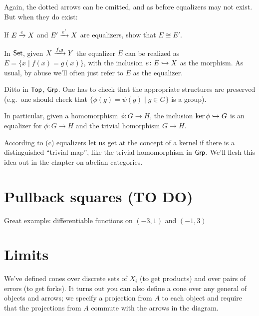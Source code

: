 Again, the dotted arrows can be omitted, and as before equalizers may not exist.
But when they do exist:
\begin{exercise}
	If $E \xrightarrow{e} X$ and $E' \xrightarrow{e'} X$ are equalizers,
	show that $E \cong E'$.
\end{exercise}

\begin{example}
	\listhack
	\begin{enumerate}[(a)]
		\ii In $\mathsf{Set}$, given $X \xrightarrow{f,g} Y$
		the equalizer $E$ can be realized as $E = \{x \mid f(x) = g(x)\}$,
		with the inclusion $e \colon E \hookrightarrow X$ as the morphism.
		As usual, by abuse we'll often just refer to $E$ as the equalizer.

		\ii Ditto in $\mathsf{Top}$, $\mathsf{Grp}$.
		One has to check that the appropriate structures are preserved
		(e.g.\ one should check that $\{\phi(g) = \psi(g) \mid g \in G\}$ is a group).

		\ii In particular, given a homomorphism $\phi \colon G \to H$, the inclusion
		$ \ker\phi \hookrightarrow G $
		is an equalizer for $\phi \colon G \to H$ and the trivial homorphism $G \to H$.
	\end{enumerate}
\end{example}

According to (c) equalizers let us get at the concept of a kernel
if there is a distinguished
``trivial map'', like the trivial homomorphism in $\mathsf{Grp}$.
We'll flesh this idea out in the chapter on abelian categories.

\section{Pullback squares (TO DO)}
Great example: differentiable functions on $(-3,1)$ and $(-1,3)$

\begin{example}
	\label{ex:diff_pullback}
\end{example}

\section{Limits}
We've defined cones over discrete sets of $X_i$ (to get products)
and over pairs of errors (to get forks).
It turns out you can also define a cone over any general  of objects and arrows;
we specify a projection from $A$ to each object and
require that the projections from $A$ commute with the arrows in the diagram.

